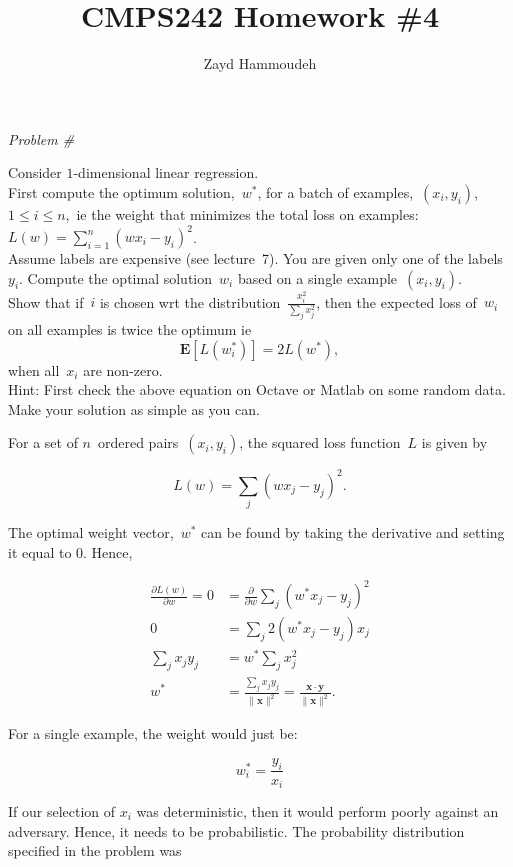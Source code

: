 \documentclass{report}
\title{\textbf{CMPS242 Homework \#4}}
\author{Zayd Hammoudeh}
\newcounter{problemCount}
\newenvironment{problemshell}{
  \par%
  \medskip
  \leftskip=0pt\rightskip=0pt%
}
{
  \par\medskip
}
\newenvironment{problem}
{%
  \stepcounter{problemCount}
  \begin{problemshell}
    \noindent \textit{Problem \#\arabic{problemCount}} \\
    \bfseries  
}
{
  \end{problemshell}
}
\newcommand{\problemspace}{\\[0.4em]}
\newcommand{\norm}[1]{\lVert\mathbf{#1}\rVert^{2}}
\begin{document}
  \maketitle
  
  \begin{problem}
    Consider $1$-dimensional linear regression.
    \problemspace
    First compute the optimum solution,~$w^{*}$, for a batch of examples,~${(x_i,y_i)}$, ${1 \leq i \leq n}$,~ie the weight that minimizes the total loss on examples:~${L(w)=\sum_{i=1}^n(wx_{i}-y_{i})^2}$.
    \problemspace
    Assume labels are expensive (see lecture~7).  You are given only one of the labels~$y_{i}$.  Compute the optimal solution~$w_i$ based on a single example~$(x_i,y_i)$.
    \problemspace
    Show that if~$i$ is chosen wrt the distribution~$\frac{x_{i}^{2}}{\sum_{j}x_{j}^{2}}$, then the expected loss of~$w_{i}$ on all examples is twice the optimum ie
    \[\mathbf{E}[L(w_{i}^{*})] = 2L(w^{*}), \]
    \noindent
    when all~$x_i$ are non-zero.
    \problemspace
    Hint: First check the above equation on Octave or Matlab on some random data.  Make your solution as simple as you can.
  \end{problem}
  
  For a set of $n$~ordered pairs~$(x_i,y_i)$, the squared loss function~$L$ is given by
  
  \begin{equation}
    L(w)=\sum_{j} (w x_{j}-y_{j})^2\textrm{.}
  \end{equation}

  The optimal weight vector,~$w^{*}$ can be found by taking the derivative and setting it equal to 0.  Hence,
  
  \begin{align}
    \frac{\partial L(w)}{\partial w}=0&=\frac{\partial}{\partial w}\sum_{j} (w^{*} x_{j}-y_{j})^2\\
    0&=\sum_{j} 2(w^{*} x_{j}-y_{j})x_{j}\\
    \sum_{j} x_{j}y_{j} &= w^{*} \sum_{j} x_{j}^2\\
    w^{*}&=\frac{\sum_{j}x_{j}y_{j}}{\norm{x}}=\frac{\mathbf{x}\cdot\mathbf{y}}{\norm{x}} \textrm{.}
  \end{align}
  
  For a single example, the weight would just be:
  
  \begin{equation}
    w_{i}^{*}=\frac{y_{i}}{x_{i}}
  \end{equation}
  
  If our selection of $x_i$ was deterministic, then it would perform poorly against an adversary. Hence, it needs to be probabilistic.  The probability distribution specified in the problem was
  
\end{document}
